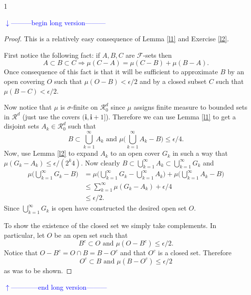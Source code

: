 \documentclass[10pt,letterpaper,twocolumn]{article}
\newcommand{\bs}{\boldsymbol}
\def\Ver{1}
\def\LongVer{1}
\begin{document}
\if\Ver\LongVer{
{\flushleft\textcolor{blue}{$\downarrow$---------begin long version---------}}\newline



\begin{proof} This is a relatively easy consequence of Lemma \ref{l1} and Exercise \ref{l2}.


First notice the following fact: if $A,B,C$ are $\mathcal F$-sets then
\begin{equation}
\label{trans}
 A\subset B\subset C \Rightarrow \mu(C-A)=\mu(C-B)+\mu(B-A). \end{equation}
Once consequence of this fact is that it will be sufficient to approximate $B$ by an open covering $O$ such that $\mathcal \mu(O-B)<\epsilon/2$ and by a closed subset $C$ such that $\mathcal \mu(B-C)<\epsilon/2$.

Now notice that $\mu$ is $\sigma$-finite on $\mathcal R_0^d$
since $\mu$ assigns finite measure to bounded sets in $\mathcal R^d$ (just use the covers $(\bs i,\bs i+1]$). Therefore we can use Lemma \ref{l1} to get a disjoint sets $A_k\in\mathcal R^d_0$ such that
\[ B\subset \bigcup_{k=1}^\infty A_k \text{ and } \mu\bigl( \bigcup_{k=1}^\infty A_k-B \bigr)\leq \epsilon/4. \]
Now, use Lemma \ref{l2} to expand $A_k$ to an open cover $G_k$ in such a way that $\mu(G_k-A_k)\leq \epsilon /(2^k 4)$. Now clearly $B\subset \bigcup_{k=1}^\infty A_k\subset  \bigcup_{k=1}^\infty G_k$ and
\begin{align*}
\mu\bigl( \bigcup_{k=1}^\infty G_k-B \bigr) &= \mu\bigl(\bigcup_{k=1}^\infty G_k - \bigcup_{k=1}^\infty A_k \bigr)+ \mu\bigl( \bigcup_{k=1}^\infty A_k-B \bigr) \\
&\leq \sum_{k=1}^\infty \mu(G_k - A_k) + \epsilon/4\\
&\leq \epsilon/2.
\end{align*}
Since  $\bigcup_{k=1}^\infty G_k$ is open have constructed the desired open set $O$.

To show the existence of the closed set we simply take complements. In particular, let $O$ be an open set such that
\[ B^c \subset O\text{ and } \mu(O - B^c)\leq \epsilon/2.\]
Notice that $O-B^c = O\cap B = B - O^c$  and that $O^c$ is a closed set. Therefore
\[ O^c \subset B\text{ and } \mu(B - O^c)\leq \epsilon/2\]
as was to be shown.
\end{proof}

%
{\flushleft\textcolor{blue}{$\uparrow$------------end long version---------}}\newline
} \fi
\end{document}
